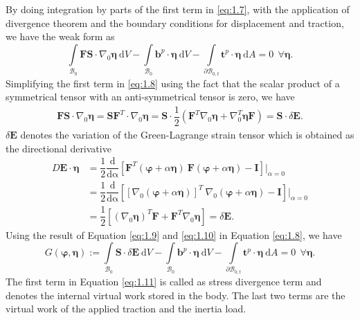 \documentclass[11pt,a4paper,final]{article}
\begin{document}
By doing integration by parts of the first term in \eqref{eq:1.7}, with the application of divergence theorem and the boundary conditions for displacement and traction, we have the weak form as 
\begin{equation}
\int\limits_{\mathcal{B}_0} \mathbf{F S} \cdot \nabla_0 \bm{\eta} \ \mathrm{d}V - \int\limits_{\mathcal{B}_0} \mathbf{b}^p \cdot \bm{\eta} \ \mathrm{d}V - \int\limits_{\mathcal{\partial B}_{0,t}} \mathbf{t}^p \cdot \bm{\eta} \ \mathrm{d}A = 0 \ \ \forall \bm{\eta}.
\label{eq:1.8}
\end{equation}
Simplifying the first term in \eqref{eq:1.8} using the fact that the scalar product of a symmetrical tensor with an anti-symmetrical tensor is zero, we have
\begin{align}
\mathbf{F S} \cdot \nabla_0 \bm{\eta} = \mathbf{S} \mathbf{F}^T \cdot \nabla_0 \bm{\eta} = \mathbf{S} \cdot \dfrac{1}{2} (\mathbf{F}^T \nabla_0 \bm{\eta} + \nabla_0^T \bm{\eta} \mathbf{F}) = \mathbf{S} \cdot \delta \mathbf{E}.
\label{eq:1.9}
\end{align}
$\delta \mathbf{E}$ denotes the variation of the Green-Lagrange strain tensor which is obtained as the directional derivative
\begin{align}
D\mathbf{E} \cdot \bm{\eta} &= \dfrac{1}{2} \dfrac{\mathrm{d}}{\mathrm{d\alpha}} \left[ \mathbf{F}^T (\bm{\varphi} + \alpha \bm{\eta}) \ \mathbf{F}(\bm{\varphi} + \alpha \bm{\eta}) - \mathbf{I} \right] \Big|_{\alpha = 0} \nonumber \\
&= \dfrac{1}{2} \dfrac{\mathrm{d}}{\mathrm{d\alpha}} \left[ {\left[ \nabla_0 (\bm{\varphi} + \alpha \bm{\eta}) \right]}^T \ \nabla_0(\bm{\varphi} + \alpha \bm{\eta}) - \mathbf{I} \right] \Big|_{\alpha = 0} \nonumber \\
&= \dfrac{1}{2} \left[ (\nabla_0 \bm{\eta})^T \mathbf{F} + \mathbf{F}^T \nabla_0 \bm{\eta} \right] = \delta \mathbf{E}.
\label{eq:1.10}
\end{align}
Using the result of Equation \eqref{eq:1.9} and \eqref{eq:1.10} in Equation \eqref{eq:1.8}, we have
\begin{equation}
G(\bm{\varphi},\bm{\eta}):= \int\limits_{\mathcal{B}_0} \mathbf{S} \cdot \delta \mathbf{E} \ \mathrm{d}V - \int\limits_{\mathcal{B}_0} \mathbf{b}^p \cdot \bm{\eta} \ \mathrm{d}V - \int\limits_{\mathcal{\partial B}_{0,t}} \mathbf{t}^p \cdot \bm{\eta} \ \mathrm{d}A = 0 \ \ \forall \bm{\eta}.
\label{eq:1.11}
\end{equation}
The first term in Equation \eqref{eq:1.11} is called as  stress divergence term and denotes the internal virtual work stored in the body. The last two terms are the virtual work of the applied traction and the inertia load.
\end{document}
